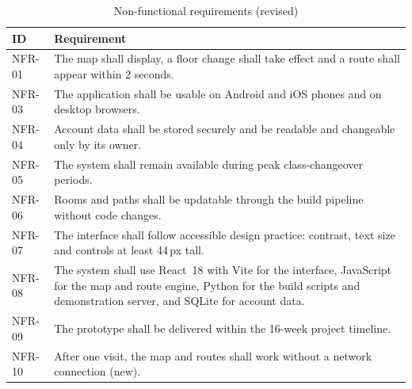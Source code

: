 \documentclass[12pt,a4paper]{report}
\newcommand{\tablespacing}{\singlespacing\small}
\begin{document}
\begin{table}[htbp]
\centering\tablespacing
\caption{Non-functional requirements (revised)}\label{tab:nfr}
\begin{tabular}{p{1.5cm}p{12.5cm}}
\toprule
ID & Requirement \\
\midrule
NFR-01 & The map shall display, a floor change shall take effect and a route shall appear within 2 seconds. \\
NFR-03 & The application shall be usable on Android and iOS phones and on desktop browsers. \\
NFR-04 & Account data shall be stored securely and be readable and changeable only by its owner. \\
NFR-05 & The system shall remain available during peak class-changeover periods. \\
NFR-06 & Rooms and paths shall be updatable through the build pipeline without code changes. \\
NFR-07 & The interface shall follow accessible design practice: contrast, text size and controls at least 44\,px tall. \\
NFR-08 & The system shall use React~18 with Vite for the interface, JavaScript for the map and route engine, Python for the build scripts and demonstration server, and SQLite for account data. \\
NFR-09 & The prototype shall be delivered within the 16-week project timeline. \\
NFR-10 & After one visit, the map and routes shall work without a network connection (new). \\
\bottomrule
\end{tabular}
\end{table}
\end{document}
